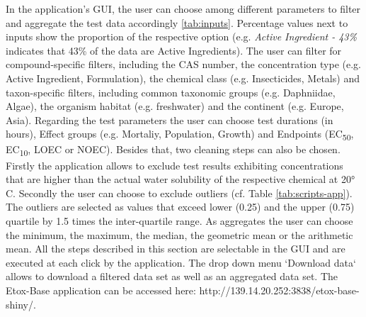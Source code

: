 \documentclass[english]{article}
\newcommand{\etoxbase}{Etox-Base}
\newcommand{\app}{http://139.14.20.252:3838/etox-base-shiny/}
\newcommand{\ecfifty}{EC\textsubscript{50}}
\begin{document}
In the application's GUI, the user can choose among different parameters to filter and aggregate the test data accordingly \ref{tab:inputs}. Percentage values next to inputs show the proportion of the respective option (e.g. \textit{Active Ingredient - 43\%} indicates that 43\% of the data are Active Ingredients). The user can filter for compound-specific filters, including the CAS number, the concentration type (e.g. Active Ingredient, Formulation), the chemical class (e.g. Insecticides, Metals) and taxon-specific filters, including common taxonomic groups (e.g. Daphniidae, Algae), the organism habitat (e.g. freshwater) and the continent (e.g. Europe, Asia). Regarding the test parameters the user can choose test durations (in hours), Effect groups (e.g. Mortaliy, Population, Growth) and Endpoints (\ecfifty, EC\textsubscript{10}, LOEC or NOEC). Besides that, two cleaning steps can also be chosen. Firstly the application allows to exclude test results exhibiting concentrations that are higher than the actual water solubility of the respective chemical at \ang{20} C. Secondly the user can choose to exclude outliers (cf. Table \ref{tab:scripts-app}). The outliers are selected as values that exceed lower (0.25) and the upper (0.75) quartile by 1.5 times the inter-quartile range. As aggregates the user can choose the minimum, the maximum, the median, the geometric mean or the arithmetic mean. All the steps described in this section are selectable in the GUI and are executed at each click by the application. The drop down menu `Download data` allows to download a filtered data set as well as an aggregated data set.
The \etoxbase{} application can be accessed here: \app{}.
\end{document}
